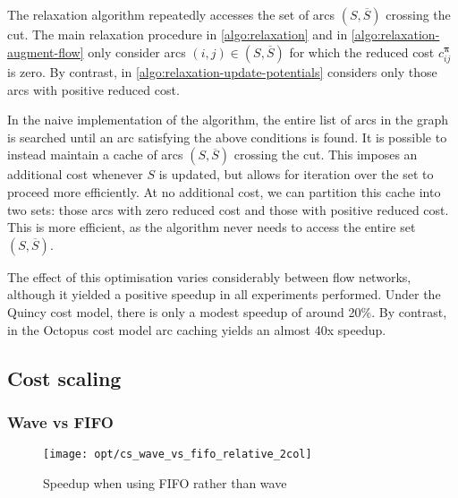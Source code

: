 The relaxation algorithm repeatedly accesses the set of arcs $\left(S,\overline{S}\right)$ crossing the cut. The main relaxation procedure in \cref{algo:relaxation} and  in \cref{algo:relaxation-augment-flow} only consider arcs $(i,j) \in \left(S,\overline{S}\right)$ for which the reduced cost $c_{ij}^{\boldsymbol{\pi}}$ is zero. By contrast,  in \cref{algo:relaxation-update-potentials} considers only those arcs with positive reduced cost.

In the naive implementation of the algorithm, the entire list of arcs in the graph is searched until an arc satisfying the above conditions is found. It is possible to instead maintain a cache of arcs $\left(S,\overline{S}\right)$ crossing the cut. This imposes an additional cost whenever $S$ is updated, but allows for iteration over the set to proceed more efficiently. At no additional cost, we can partition this cache into two sets: those arcs with zero reduced cost and those with positive reduced cost\footnotemark. This is more efficient, as the algorithm never needs to access the entire set $\left(S,\overline{S}\right)$.

The effect of this optimisation varies considerably between flow networks, although it yielded a positive speedup in all experiments performed. Under the Quincy cost model, there is only a modest speedup of around 20\%. By contrast, in the Octopus cost model arc caching yields an almost 40x speedup.

\subsection{Cost scaling}

\subsubsection{Wave vs FIFO}

\begin{figure}
    \centering
    \texttt{[image: opt/cs\_wave\_vs\_fifo\_relative\_2col]}
    \caption{Speedup when using FIFO rather than wave}
    \label{fig:opt-cs-wave-vs-fifo}
\end{figure}


